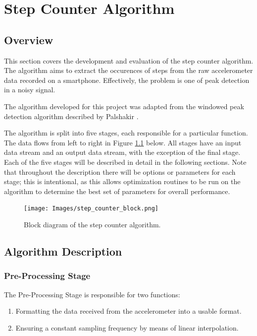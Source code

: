 \part{Step Counter Algorithm}

    \chapter{Overview}

        This section covers the development and evaluation of the step counter algorithm. The algorithm aims to extract the occurences of steps from the raw accelerometer data recorded on a smartphone. Effectively, the problem is one of peak detection in a noisy signal.

        The algorithm developed for this project was adapted from the windowed peak detection algorithm described by Palshakir \cite{palshikar}.

        The algorithm is split into five stages, each responsible for a particular function. The data flows from left to right in Figure \ref{img_sc_block} below. All stages have an input data stream and an output data stream, with the exception of the final stage. Each of the five stages will be described in detail in the following sections. Note that throughout the description there will be options or parameters for each stage; this is intentional, as this allows optimization routines to be run on the algorithm to determine the best set of parameters for overall performance. 

        \begin{figure}[h]
            \texttt{[image: Images/step\_counter\_block.png]}
            \centering
            \caption{Block diagram of the step counter algorithm.}
            \label{img_sc_block}
        \end{figure}

    \chapter{Algorithm Description}

        \section{Pre-Processing Stage}

            The Pre-Processing Stage is responsible for two functions:

            \begin{enumerate}
                \item Formatting the data received from the accelerometer into a usable format.
                \item Ensuring a constant sampling frequency by means of linear interpolation.
            \end{enumerate}

